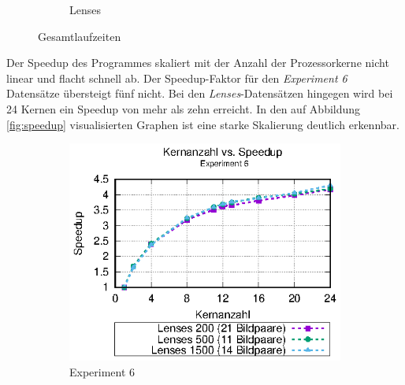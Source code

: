 \begin{center}
\begin{figure}
\begin{subfigure}[b]{0.49\textwidth}
			\caption[Lenses]{Lenses}
			\label{fig:times_lenses}
		\end{subfigure}
		\caption{Gesamtlaufzeiten}
		\label{fig:gesamtlaufzeiten}
	\end{figure}
\end{center}

Der Speedup des Programmes skaliert mit der Anzahl der Prozessorkerne nicht linear und flacht schnell ab. Der Speedup-Faktor für den \textit{Experiment 6} Datensätze übersteigt fünf nicht. Bei den \textit{Lenses}-Datensätzen hingegen wird bei 24 Kernen ein Speedup von mehr als zehn erreicht. In den auf Abbildung \ref{fig:speedup} visualisierten Graphen ist eine starke Skalierung deutlich erkennbar. 

\begin{center}
	\begin{figure}
		\begin{subfigure}[b]{0.49\textwidth}
			\centering
			\includegraphics[width=\textwidth]{pdf/speedup_exp6}
			\caption[Experiment 6]{Experiment 6}
			\label{fig:speedup_exp6}
		\end{subfigure}
		\hfill
		\begin{subfigure}[b]{0.49\textwidth}
			\centering

\end{subfigure}
\end{figure}
\end{center}

